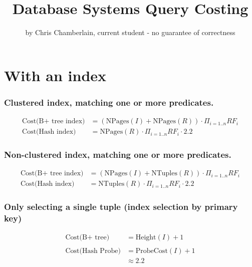 \documentclass[10pt]{article}
\newcommand{\NPages}{\mathrm{NPages}}
\newcommand{\NTuples}{\mathrm{NTuples}}
\newcommand{\ProbeCost}{\mathrm{ProbeCost}}
\begin{document}
\title{Database Systems Query Costing}
\author{by Chris Chamberlain, current student - no guarantee of correctness}

\maketitle

\section{With an index}

\begin{greenbox}

\subsubsection*{Clustered index, matching one or more predicates.}

\begin{align*}
    \text{Cost(B+ tree index)} &= (\NPages(I) + \NPages(R)) \cdot \Pi_{i=1..n} RF_i \\
    \text{Cost(Hash index)} &= \NPages(R) \cdot \Pi_{i=1..n} RF_i \cdot 2.2
\end{align*}

\subsubsection*{Non-clustered index, matching one or more predicates.}

\begin{align*}
\text{Cost(B+ tree index)} &= (\NPages(I) + \NTuples(R)) \cdot \Pi_{i=1..n} RF_i \\
\text{Cost(Hash  index)} &= \NTuples(R) \cdot \Pi_{i=1..n} RF_i \cdot 2.2
\end{align*}

\subsubsection*{Only selecting a single tuple (index selection by primary key)}

\begin{align*}
\text{Cost(B+ tree)} &= \textrm{Height}(I) + 1 \\
\;\\
\text{Cost(Hash Probe)} &= \ProbeCost(I) + 1 \\
    &\approx 2.2 \\
\end{align*}

\end{greenbox}
\end{document}
